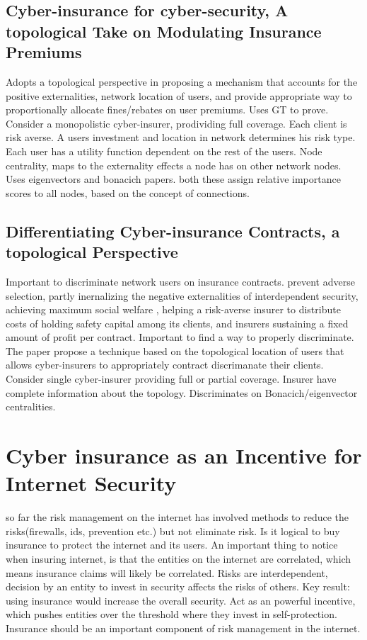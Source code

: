 \subsection{Cyber-insurance for cyber-security, A topological Take on Modulating Insurance Premiums}
\cite{pal2012cyberinsurance}
Adopts a topological perspective in proposing a mechanism that accounts for the positive
 externalities, network location of users, and provide appropriate way to proportionally allocate
  fines/rebates on user premiums. Uses GT to prove. Consider a monopolistic cyber-insurer, prodividing
   full coverage. Each client is risk averse. A users investment and location in network determines
    his risk type. Each user has a utility function dependent on the rest of the users. 
    Node centrality, maps to the externality effects a node has on other network nodes. Uses
    eigenvectors and bonacich papers. both these assign relative importance scores to all nodes, based on the concept of connections.  


\subsection{Differentiating Cyber-insurance Contracts, a topological Perspective}

\cite{paldifferentiating}
Important to discriminate network users on insurance contracts. prevent adverse selection, partly
 inernalizing the negative externalities of interdependent security, achieving maximum social welfare
 , helping a risk-averse insurer to distribute costs of holding safety capital among its clients, and
  insurers sustaining a fixed amount of profit per contract.
Important to find a way to properly discriminate.
The paper propose a technique based on the topological location of users that allows cyber-insurers to
 appropriately contract discrimanate their clients. Consider single cyber-insurer providing full or
  partial coverage. Insurer have complete information about the topology.
  Discriminates on Bonacich/eigenvector centralities.

\section{Cyber insurance as an Incentive for Internet Security}
so far the risk management on the internet has involved methods to reduce the
risks(firewalls, ids, prevention etc.) but not eliminate risk. Is it logical to buy
insurance to protect the internet and its users.
An important thing to notice when insuring internet, 
is that the entities on the internet are correlated, 
which means insurance claims will likely be correlated. Risks are interdependent, 
decision by an entity to invest in security affects the risks of others.
Key result: using insurance would increase the overall security. 
Act as an powerful incentive, which pushes entities over the threshold where they invest in self-protection.
 Insurance should be an important component of risk management in the internet.

